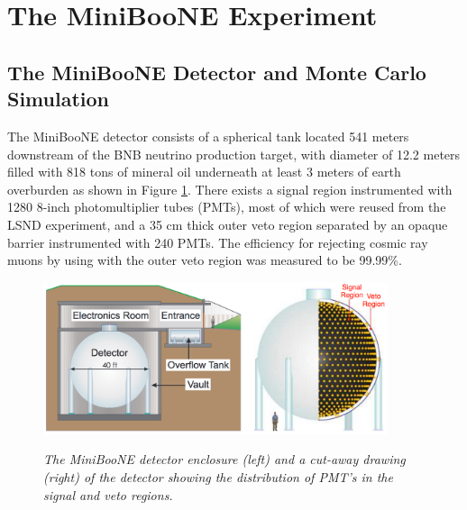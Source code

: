 \section{The MiniBooNE Experiment}

\subsection{The MiniBooNE Detector and Monte Carlo Simulation}



The MiniBooNE detector \cite{MBDetectorPaper} consists of a spherical tank located 541 meters downstream of the BNB neutrino production target, with diameter of 12.2 meters filled with 818 tons of mineral oil underneath at least 3 meters of earth overburden as shown in Figure \ref{MB_detector_fig}. There exists a signal region instrumented with 1280 8-inch photomultiplier tubes (PMTs), most of which were reused from the LSND experiment, and a 35 cm thick outer veto region separated by an opaque barrier instrumented with 240 PMTs. The efficiency for rejecting cosmic ray muons by using with the outer veto region was measured to be 99.99\%.\\
\begin{figure}[ht!]
\centering
	\includegraphics[width=0.9\textwidth]{Figures/MB_detectorpaper_fig.png} \\
\caption{\textit{The MiniBooNE detector enclosure (left) and a cut-away drawing (right) of the detector showing the distribution of PMT's in the signal and veto regions.}}\label{MB_detector_fig}
\end{figure}

